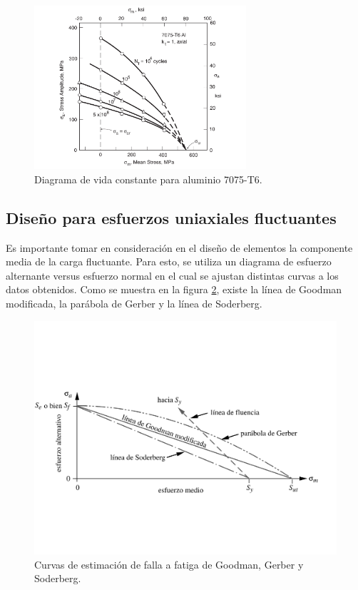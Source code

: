 \begin{figure}[h]
\centering
\includegraphics[width=0.7\textwidth]{Imagenes/diag_cfl.pdf}
\caption{Diagrama de vida constante para aluminio 7075-T6. \cite{dowling2013mechanical}}
\label{fig:diag_cfl}
\end{figure}

\newpage

\subsection{Diseño para esfuerzos uniaxiales fluctuantes}
Es importante tomar en consideración en el diseño de elementos la componente media de la carga fluctuante. Para esto, se utiliza un diagrama de esfuerzo alternante versus esfuerzo normal en el cual se ajustan distintas curvas a los datos obtenidos. Como se muestra en la figura \ref{fig:falla_fat}, existe la línea de Goodman modificada, la parábola de Gerber y la línea de Soderberg. 

\begin{figure}[h]
\centering
\includegraphics[width=0.8\linewidth, trim={0cm 4.5cm 0cm 5.5cm},clip]{Imagenes/falla_fat.pdf}
\caption{Curvas de estimación de falla a fatiga de Goodman, Gerber y Soderberg.\cite{norton2011machine}}
\label{fig:falla_fat}
\end{figure}

